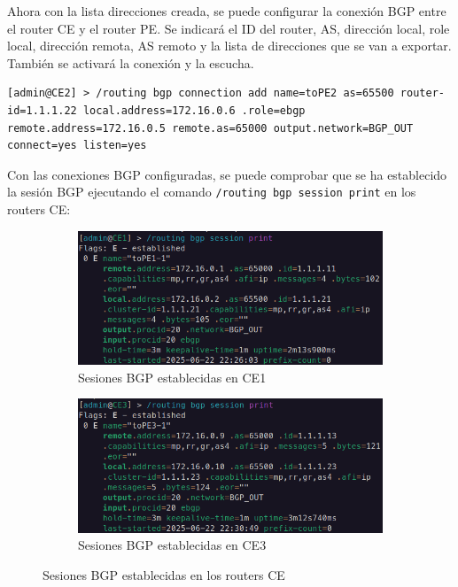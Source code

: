 Ahora con la lista direcciones creada, se puede configurar la conexión BGP entre el router CE y el router PE. Se indicará el ID del router, AS, dirección local, role local, dirección remota, AS remoto y la lista de direcciones que se van a exportar. También se activará la conexión y la escucha.
\begin{lstlisting}[language=RouterOS]
[admin@CE2] > /routing bgp connection add name=toPE2 as=65500 router-id=1.1.1.22 local.address=172.16.0.6 .role=ebgp remote.address=172.16.0.5 remote.as=65000 output.network=BGP_OUT connect=yes listen=yes
\end{lstlisting}

Con las conexiones BGP configuradas, se puede comprobar que se ha establecido la sesión BGP ejecutando el comando \lstinline[language=RouterOS]|/routing bgp session print| en los routers CE:

\begin{figure}[H]
	\centering
	\begin{subfigure}[b]{0.48\textwidth}
		\centering
		\includegraphics[width=\textwidth]{images/CE1_bgp_print.png}
		\caption{Sesiones BGP establecidas en CE1}
		\label{fig:CE1_bgp_print}
	\end{subfigure}
	\hfill
	\begin{subfigure}[b]{0.48\textwidth}
		\centering
		\includegraphics[width=\textwidth]{images/CE3_bgp_print.png}
		\caption{Sesiones BGP establecidas en CE3}
		\label{fig:CE3_bgp_print}
	\end{subfigure}
	\caption{Sesiones BGP establecidas en los routers CE}
	\label{fig:bgp_sessions}
\end{figure}

